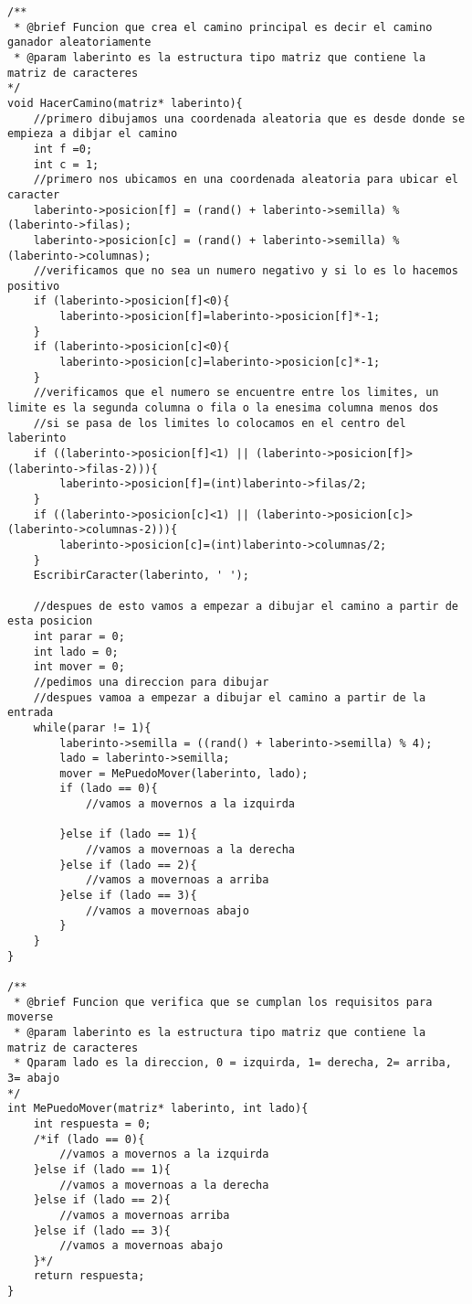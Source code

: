 \begin{verbatim}
/**
 * @brief Funcion que crea el camino principal es decir el camino ganador aleatoriamente 
 * @param laberinto es la estructura tipo matriz que contiene la matriz de caracteres
*/
void HacerCamino(matriz* laberinto){
    //primero dibujamos una coordenada aleatoria que es desde donde se empieza a dibjar el camino
    int f =0;
    int c = 1;
    //primero nos ubicamos en una coordenada aleatoria para ubicar el caracter
    laberinto->posicion[f] = (rand() + laberinto->semilla) % (laberinto->filas);
    laberinto->posicion[c] = (rand() + laberinto->semilla) % (laberinto->columnas);
    //verificamos que no sea un numero negativo y si lo es lo hacemos positivo
    if (laberinto->posicion[f]<0){
        laberinto->posicion[f]=laberinto->posicion[f]*-1;
    }
    if (laberinto->posicion[c]<0){
        laberinto->posicion[c]=laberinto->posicion[c]*-1;
    }
    //verificamos que el numero se encuentre entre los limites, un limite es la segunda columna o fila o la enesima columna menos dos
    //si se pasa de los limites lo colocamos en el centro del laberinto
    if ((laberinto->posicion[f]<1) || (laberinto->posicion[f]>(laberinto->filas-2))){
        laberinto->posicion[f]=(int)laberinto->filas/2;
    }
    if ((laberinto->posicion[c]<1) || (laberinto->posicion[c]>(laberinto->columnas-2))){
        laberinto->posicion[c]=(int)laberinto->columnas/2;
    }
    EscribirCaracter(laberinto, ' ');

    //despues de esto vamos a empezar a dibujar el camino a partir de esta posicion 
    int parar = 0;
    int lado = 0;
    int mover = 0;
    //pedimos una direccion para dibujar
    //despues vamoa a empezar a dibujar el camino a partir de la entrada
    while(parar != 1){
        laberinto->semilla = ((rand() + laberinto->semilla) % 4);
        lado = laberinto->semilla;
        mover = MePuedoMover(laberinto, lado);
        if (lado == 0){
            //vamos a movernos a la izquirda
            
        }else if (lado == 1){
            //vamos a movernoas a la derecha
        }else if (lado == 2){
            //vamos a movernoas a arriba
        }else if (lado == 3){
            //vamos a movernoas abajo
        }
    }
}

/**
 * @brief Funcion que verifica que se cumplan los requisitos para moverse
 * @param laberinto es la estructura tipo matriz que contiene la matriz de caracteres
 * Qparam lado es la direccion, 0 = izquirda, 1= derecha, 2= arriba, 3= abajo
*/
int MePuedoMover(matriz* laberinto, int lado){
    int respuesta = 0;
    /*if (lado == 0){
        //vamos a movernos a la izquirda
    }else if (lado == 1){
        //vamos a movernoas a la derecha
    }else if (lado == 2){
        //vamos a movernoas arriba
    }else if (lado == 3){
        //vamos a movernoas abajo
    }*/
    return respuesta;
}
\end{verbatim}
\newpage	







